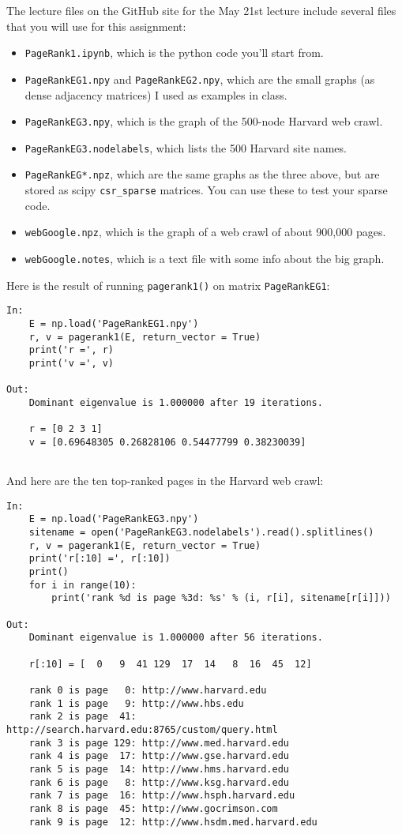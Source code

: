 \documentclass[11pt]{article}
\begin{document}
The lecture files on the GitHub site for the May 21st lecture  
include several files that you will use for this assignment:
\begin{itemize}
\item{\tt PageRank1.ipynb}, which is the python code you'll start from.
\item{\tt PageRankEG1.npy} and {\tt PageRankEG2.npy}, which are the small
   graphs (as dense adjacency matrices) I used as examples in class.
\item{\tt PageRankEG3.npy}, which is the graph of the 500-node Harvard web crawl.
\item{\tt PageRankEG3.nodelabels}, which lists the 500 Harvard site names.
\item{\tt PageRankEG*.npz}, which are the same graphs as the three above, but
   are stored as scipy {\tt csr\_sparse} matrices. You can use these to test
   your sparse code.
\item{\tt webGoogle.npz}, which is the graph of a web crawl of about 900,000 pages.
\item{\tt webGoogle.notes}, which is a text file with some info about the big graph.
\end{itemize}
Here is the result of running {\tt pagerank1()} on matrix {\tt PageRankEG1}:
\begin{verbatim}
In:
    E = np.load('PageRankEG1.npy')
    r, v = pagerank1(E, return_vector = True)
    print('r =', r)
    print('v =', v)

Out:
    Dominant eigenvalue is 1.000000 after 19 iterations.
    
    r = [0 2 3 1]
    v = [0.69648305 0.26828106 0.54477799 0.38230039]


\end{verbatim}
And here are the ten top-ranked pages in the Harvard web crawl:
\begin{verbatim}
In:
    E = np.load('PageRankEG3.npy')
    sitename = open('PageRankEG3.nodelabels').read().splitlines()
    r, v = pagerank1(E, return_vector = True)
    print('r[:10] =', r[:10])
    print()
    for i in range(10):
        print('rank %d is page %3d: %s' % (i, r[i], sitename[r[i]]))

Out:
    Dominant eigenvalue is 1.000000 after 56 iterations.
    
    r[:10] = [  0   9  41 129  17  14   8  16  45  12]
    
    rank 0 is page   0: http://www.harvard.edu
    rank 1 is page   9: http://www.hbs.edu
    rank 2 is page  41: http://search.harvard.edu:8765/custom/query.html
    rank 3 is page 129: http://www.med.harvard.edu
    rank 4 is page  17: http://www.gse.harvard.edu
    rank 5 is page  14: http://www.hms.harvard.edu
    rank 6 is page   8: http://www.ksg.harvard.edu
    rank 7 is page  16: http://www.hsph.harvard.edu
    rank 8 is page  45: http://www.gocrimson.com
    rank 9 is page  12: http://www.hsdm.med.harvard.edu
\end{verbatim}
\end{document}
